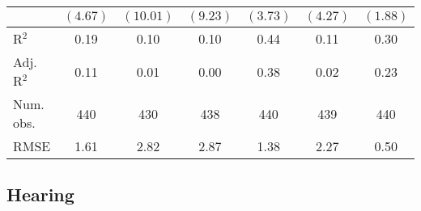 \documentclass[fullpage]{paper}
\begin{document}
\begin{center}
\begin{longtable}{l c c c c c c }
            & $(4.67)$      & $(10.01)$     & $(9.23)$      & $(3.73)$       & $(4.27)$       & $(1.88)$      \\
\hline
R$^2$       & 0.19          & 0.10          & 0.10          & 0.44           & 0.11           & 0.30          \\
Adj. R$^2$  & 0.11          & 0.01          & 0.00          & 0.38           & 0.02           & 0.23          \\
Num. obs.   & 440           & 430           & 438           & 440            & 439            & 440           \\
RMSE        & 1.61          & 2.82          & 2.87          & 1.38           & 2.27           & 0.50          \\
\end{longtable}
\end{center}
\subsection{ Hearing }
\end{document}
